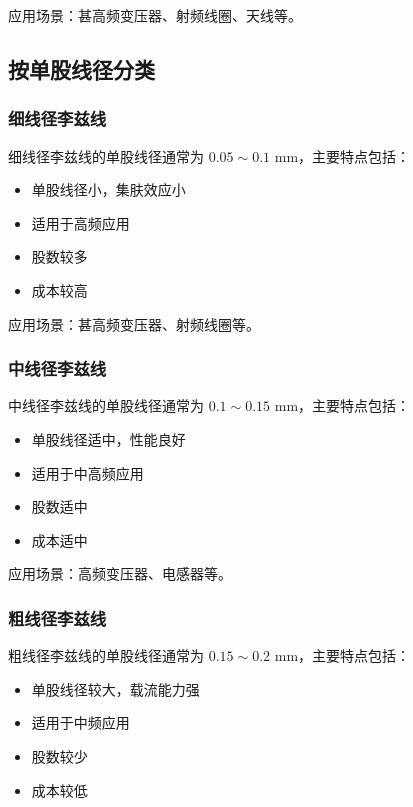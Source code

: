 \documentclass[12pt,UTF8]{ctexbook}
\begin{document}
应用场景：甚高频变压器、射频线圈、天线等。

\subsection{按单股线径分类}

\subsubsection{细线径李兹线}

细线径李兹线的单股线径通常为 $0.05 \sim 0.1$ mm，主要特点包括：

\begin{itemize}[leftmargin=2cm]
    \item 单股线径小，集肤效应小
    \item 适用于高频应用
    \item 股数较多
    \item 成本较高
\end{itemize}

应用场景：甚高频变压器、射频线圈等。

\subsubsection{中线径李兹线}

中线径李兹线的单股线径通常为 $0.1 \sim 0.15$ mm，主要特点包括：

\begin{itemize}[leftmargin=2cm]
    \item 单股线径适中，性能良好
    \item 适用于中高频应用
    \item 股数适中
    \item 成本适中
\end{itemize}

应用场景：高频变压器、电感器等。

\subsubsection{粗线径李兹线}

粗线径李兹线的单股线径通常为 $0.15 \sim 0.2$ mm，主要特点包括：

\begin{itemize}[leftmargin=2cm]
    \item 单股线径较大，载流能力强
    \item 适用于中频应用
    \item 股数较少
    \item 成本较低
\end{itemize}
\end{document}
